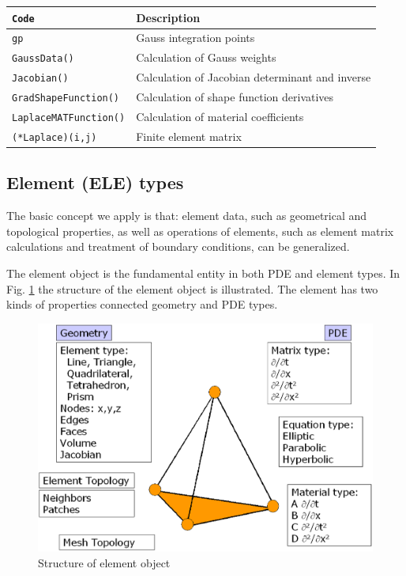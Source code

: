 \small
\begin{tabular}{|l|l|}
  \hline
  \texttt{Code} & Description \\
  \hline
  \texttt{gp} & Gauss integration points \\
  \texttt{GaussData()} & Calculation of Gauss weights \\
  \texttt{Jacobian()} & Calculation of Jacobian determinant and inverse \\
  \texttt{GradShapeFunction()} & Calculation of shape function derivatives \\
  \texttt{LaplaceMATFunction()} & Calculation of material coefficients \\
  \texttt{(*Laplace)(i,j)} & Finite element matrix \\
  \hline
\end{tabular}
\normalsize

\subsection{Element (ELE) types}
\label{sec:ele}

The basic concept we apply is that: element data, such as geometrical and topological
properties, as well as operations of elements, such as
element matrix calculations and treatment of boundary conditions,
can be generalized.

The element object is the fundamental entity in both PDE and
element types. In Fig. \ref{fig:ele_concept} the structure of the
element object is illustrated. The element has two kinds of
properties connected geometry and PDE types.

\begin{figure}[H]
\centering
\includegraphics[scale=0.4]{figures/ele_concept.eps}
\caption{Structure of element object}
\label{fig:ele_concept}
\end{figure}

